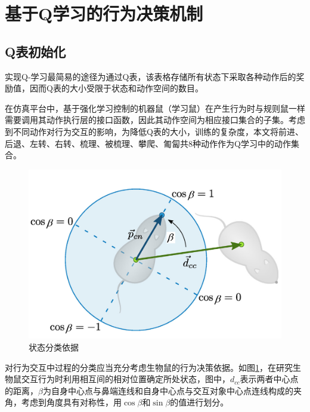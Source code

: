 \section{基于Q学习的行为决策机制}
\subsection{Q表初始化}
实现Q-学习最简易的途径为通过Q表，该表格存储所有状态下采取各种动作后的奖励值，因而Q表的大小受限于状态和动作空间的数目。

在仿真平台中，基于强化学习控制的机器鼠（学习鼠）在产生行为时与规则鼠一样需要调用其动作执行层的接口函数，因此其动作空间为相应接口集合的子集。考虑到不同动作对行为交互的影响\cite{BarnettSTheRat}，为降低Q表的大小，训练的复杂度，本文将前进、后退、左转、右转、梳理、被梳理、攀爬、匍匐共8种动作作为Q学习中的动作集合。

\begin{figure}[htbp]
  \centering
  \includegraphics[width=0.4\linewidth]{images/ch04/relpose1.png}
  \caption{状态分类依据\cite{ISI:000436213800018}}\label{figure_relpos}
\end{figure}
对行为交互中过程的分类应当充分考虑生物鼠的行为决策依据。如图\ref{figure_relpos}，\citeauthor{ISI:000436213800018}在研究生物鼠交互行为时利用相互间的相对位置确定所处状态，图中，$d_{cc}$表示两者中心点的距离，$\beta$为自身中心点与鼻端连线和自身中心点与交互对象中心点连线构成的夹角，考虑到角度具有对称性，用$\cos\beta$和$\sin\beta$的值进行划分\cite{ISI:000436213800018}。

